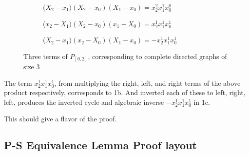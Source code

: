 \documentclass[11pt, oneside]{article} 	%
\begin{document}
\begin{figure}
\centering
\begin{subfigure}{.5\textwidth}
  \centering
  \caption{($X_2-x_1)(X_2-x_0)(X_1-x_0) = x_2^2x_1^1x_0^0$}
  \label{fig:sub1}
\end{subfigure}

\begin{subfigure}{.5\textwidth}

  \caption{($x_2-X_1)(X_2-x_0)(x_1-X_0)= x_2^1x_1^1x_0^1$}
  \label{fig:sub2}
\end{subfigure}

\begin{subfigure}{.5\textwidth}

  \caption{($X_2-x_1)(x_2-X_0)(X_1-x_0) = -x_2^1x_1^1x_0^1$}
  \label{fig:sub3}
\end{subfigure}


\caption{Three terms of  $P_{[0,2]}$, corresponding to complete directed graphs of size 3}
\label{fig:test}
\end{figure}

The term $x_2^1x_1^1x_0^1$, from multiplying the right, left, and right terms of the above product respectively, corresponds to 1b.  And inverted each of these to left, right, left, produces the inverted cycle and algebraic inverse $-x_2^1x_1^1x_0^1$ in 1c.

This should give a flavor of the proof.
\subsection{P-S Equivalence Lemma Proof layout}
\end{document}
